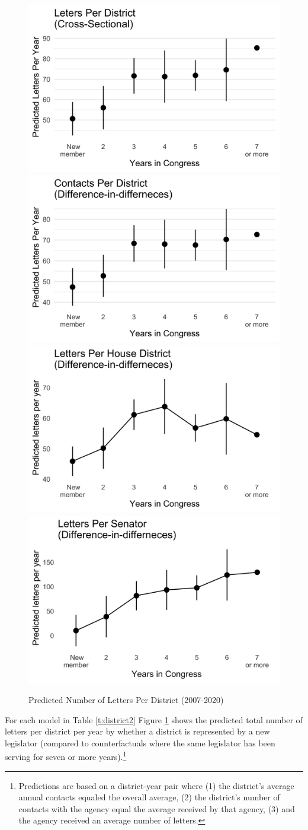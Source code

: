 \documentclass[12pt]{article}
\begin{document}
\begin{figure}[hbt!]
\centering
\caption{Predicted Number of Letters Per District (2007-2020)} \label{f:m-district-predicted}
\includegraphics[width = .49\textwidth]{figs/m-district-predicted-1}
\includegraphics[width = .49\textwidth]{figs/m-district-predicted-3}
\includegraphics[width = .49\textwidth]{figs/m-district-predicted-house-1}
\includegraphics[width = .49\textwidth]{figs/m-district-predicted-senate-1}
\end{figure}

For each model in Table \ref{t:district2} Figure \ref{f:m-district-predicted} shows the predicted total number of letters per district per year by whether a district is represented by a new legislator (compared to counterfactuals where the same legislator has been serving for seven or more years).\footnote{Predictions are based on a district-year pair where (1) the district's average annual contacts equaled the overall average, (2) the district's number of contacts with the agency equal the average received by that agency, (3) and the agency received an average number of letters.} 
\end{document}
